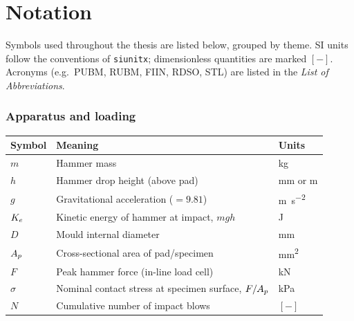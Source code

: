 \clearpage
\chapter*{Notation}
\thispagestyle{plain}

\noindent
Symbols used throughout the thesis are listed below, grouped by theme.
SI units follow the conventions of \texttt{siunitx}; dimensionless
quantities are marked $[-]$. Acronyms (e.g.\ PUBM, RUBM, FIIN, RDSO,
STL) are listed in the \emph{List of Abbreviations}.

\vspace{0.6em}

\subsection*{\color{gsvblue}Apparatus and loading}

{\small
\renewcommand{\arraystretch}{1.12}
\begin{tabular}{@{}p{}p{}p{}@{}}
\toprule
\rowcolor{tablehdr}
{\color{white}\textbf{Symbol}} & {\color{white}\textbf{Meaning}} & {\color{white}\textbf{Units}}\\
\midrule
$m$            & Hammer mass                                         & \si{\kilogram} \\
$h$            & Hammer drop height (above pad)                       & \si{\milli\metre} or \si{\metre} \\
$g$            & Gravitational acceleration ($=9.81$)                 & \si{\metre\per\second\squared} \\
$K_{e}$          & Kinetic energy of hammer at impact, $mgh$            & \si{\joule} \\
$D$            & Mould internal diameter                              & \si{\milli\metre} \\
$A_{p}$          & Cross-sectional area of pad/specimen                 & \si{\milli\metre\squared} \\
$F$            & Peak hammer force (in-line load cell)                & \si{\kilo\newton} \\
$\sigma$       & Nominal contact stress at specimen surface, $F/A_{p}$  & \si{\kilo\pascal} \\
$N$            & Cumulative number of impact blows                    & $[-]$ \\
\bottomrule
\end{tabular}}

